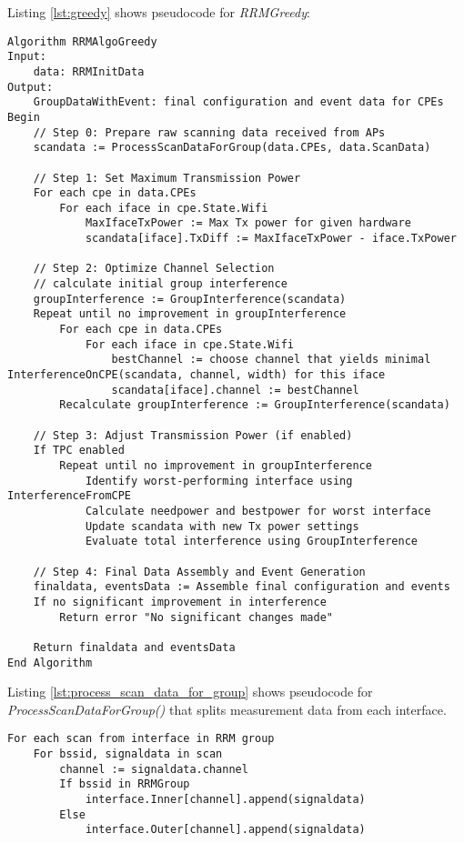 Listing \ref{lst:greedy} shows pseudocode for \textit{RRMGreedy}:
\begin{lstlisting}[language={Pseudo}, caption=greedy RRM algorithm., label=lst:greedy]
Algorithm RRMAlgoGreedy
Input:
    data: RRMInitData
Output:
    GroupDataWithEvent: final configuration and event data for CPEs
Begin
    // Step 0: Prepare raw scanning data received from APs
    scandata := ProcessScanDataForGroup(data.CPEs, data.ScanData)

    // Step 1: Set Maximum Transmission Power
    For each cpe in data.CPEs
        For each iface in cpe.State.Wifi
            MaxIfaceTxPower := Max Tx power for given hardware
            scandata[iface].TxDiff := MaxIfaceTxPower - iface.TxPower

    // Step 2: Optimize Channel Selection
    // calculate initial group interference
    groupInterference := GroupInterference(scandata)
    Repeat until no improvement in groupInterference
        For each cpe in data.CPEs
            For each iface in cpe.State.Wifi
                bestChannel := choose channel that yields minimal InterferenceOnCPE(scandata, channel, width) for this iface
                scandata[iface].channel := bestChannel
        Recalculate groupInterference := GroupInterference(scandata)

    // Step 3: Adjust Transmission Power (if enabled)
    If TPC enabled
        Repeat until no improvement in groupInterference
            Identify worst-performing interface using InterferenceFromCPE
            Calculate needpower and bestpower for worst interface
            Update scandata with new Tx power settings
            Evaluate total interference using GroupInterference

    // Step 4: Final Data Assembly and Event Generation
    finaldata, eventsData := Assemble final configuration and events
    If no significant improvement in interference
        Return error "No significant changes made"

    Return finaldata and eventsData
End Algorithm
\end{lstlisting}

Listing \ref{lst:process_scan_data_for_group} shows pseudocode for \textit{ProcessScanDataForGroup()} that splits measurement data from each interface.

\begin{lstlisting}[language={Pseudo},caption=ProcessScanDataForGroup pseudocode., label=lst:process_scan_data_for_group]
For each scan from interface in RRM group
    For bssid, signaldata in scan
        channel := signaldata.channel
        If bssid in RRMGroup
            interface.Inner[channel].append(signaldata)
        Else
            interface.Outer[channel].append(signaldata)
\end{lstlisting}


